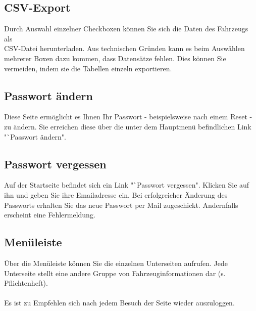 \documentclass[fontsize = 12pt, paper = a4]{scrreprt}
\begin{document}
\subsection{CSV-Export}

Durch Auswahl einzelner Checkboxen können Sie sich die Daten des Fahrzeugs als \\ CSV-Datei herunterladen. Aus technischen Gründen kann es beim Auswählen mehrerer Boxen dazu kommen, dass Datensätze fehlen. Dies können Sie vermeiden, indem sie die Tabellen einzeln exportieren.

\subsection{Passwort ändern}

Diese Seite ermöglicht es Ihnen Ihr Passwort - beispielsweise nach einem Reset - zu ändern. Sie erreichen diese über die unter dem Hauptmenü befindlichen Link "`Passwort ändern".

\subsection{Passwort vergessen}

Auf der Startseite befindet sich ein Link "`Passwort vergessen". Klicken Sie auf ihn und geben Sie ihre Emailadresse ein. Bei erfolgreicher Änderung des Passworts erhalten Sie das neue Passwort per Mail zugeschickt. Andernfalls erscheint eine Fehlermeldung.

\subsection{Menüleiste}

Über die Menüleiste können Sie die einzelnen Unterseiten aufrufen. Jede Unterseite stellt eine andere Gruppe von Fahrzeuginformationen dar (s. Pflichtenheft). \\ \\

Es ist zu Empfehlen sich nach jedem Besuch der Seite wieder auszuloggen.



\listoffigures

\end{document}
